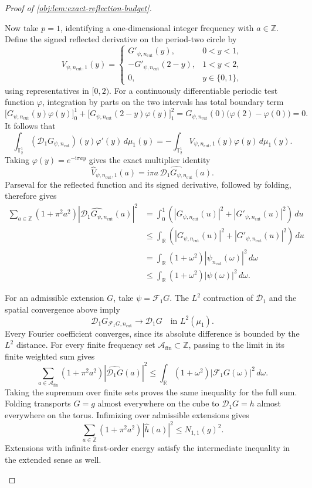 \documentclass[11pt]{article}
\begin{document}
\begin{proof}[Proof of \cref{obj:lem:exact-reflection-budget}]
\begin{enumerate}
Now take \(p=1\), identifying a one-dimensional integer frequency with \(a\in\mathbb Z\). Define the signed reflected derivative on the period-two circle by
\[
V_{\psi,n_{\mathrm{cut}},1}(y)
=
\begin{cases}
G'_{\psi,n_{\mathrm{cut}}}(y),&0<y<1,\\
-G'_{\psi,n_{\mathrm{cut}}}(2-y),&1<y<2,\\
0,&y\in\{0,1\},
\end{cases}
\]
using representatives in \([0,2)\). For a continuously differentiable periodic test function \(\varphi\), integration by parts on the two intervals has total boundary term
\[
\bigl[G_{\psi,n_{\mathrm{cut}}}(y)\varphi(y)\bigr]_0^1
+
\bigl[G_{\psi,n_{\mathrm{cut}}}(2-y)\varphi(y)\bigr]_1^2
=
G_{\psi,n_{\mathrm{cut}}}(0)\bigl(\varphi(2)-\varphi(0)\bigr)
=
0.
\]
It follows that
\[
\int_{\mathbb T_2^1}
(\mathscr D_1G_{\psi,n_{\mathrm{cut}}})(y)\varphi'(y)\,d\mu_1(y)
=
-\int_{\mathbb T_2^1}
V_{\psi,n_{\mathrm{cut}},1}(y)\varphi(y)\,d\mu_1(y).
\]
Taking \(\varphi(y)=e^{-\mathrm i\pi ay}\) gives the exact multiplier identity
\[
\widehat V_{\psi,n_{\mathrm{cut}},1}(a)
=
\mathrm i\pi a\,
\widehat{\mathscr D_1G_{\psi,n_{\mathrm{cut}}}}(a).
\]
Parseval for the reflected function and its signed derivative, followed by folding, therefore gives
\[
\begin{aligned}
\sum_{a\in\mathbb Z}(1+\pi^2a^2)
\left|\widehat{\mathscr D_1G_{\psi,n_{\mathrm{cut}}}}(a)\right|^2
&=
\int_0^1
\left(
|G_{\psi,n_{\mathrm{cut}}}(u)|^2+
|G'_{\psi,n_{\mathrm{cut}}}(u)|^2
\right)\,du\\
&\leq
\int_{\mathbb R}
\left(
|G_{\psi,n_{\mathrm{cut}}}(u)|^2+
|G'_{\psi,n_{\mathrm{cut}}}(u)|^2
\right)\,du\\
&=
\int_{\mathbb R}(1+\omega^2)
|\psi_{n_{\mathrm{cut}}}(\omega)|^2\,d\omega\\
&\leq
\int_{\mathbb R}(1+\omega^2)|\psi(\omega)|^2\,d\omega.
\end{aligned}
\]

For an admissible extension \(G\), take \(\psi=\mathcal F_1G\).
The \(L^2\) contraction of \(\mathscr D_1\) and the spatial convergence above imply
\[
\mathscr D_1G_{\mathcal F_1G,n_{\mathrm{cut}}}
\longrightarrow\mathscr D_1G
\quad\text{in }L^2(\mu_1).
\]
Every Fourier coefficient converges, since its absolute difference is bounded by the \(L^2\) distance. For every finite frequency set \(\mathcal A_{\mathrm{fin}}\subset\mathbb Z\), passing to the limit in its finite weighted sum gives
\[
\sum_{a\in\mathcal A_{\mathrm{fin}}}(1+\pi^2a^2)
|\widehat{\mathscr D_1G}(a)|^2
\leq
\int_{\mathbb R}(1+\omega^2)|\mathcal F_1G(\omega)|^2\,d\omega.
\]
Taking the supremum over finite sets proves the same inequality for the full sum. Folding transports \(G=g\) almost everywhere on the cube to
\(\mathscr D_1G=h\) almost everywhere on the torus. Infimizing over admissible extensions gives
\[
\sum_{a\in\mathbb Z}(1+\pi^2a^2)|\widehat h(a)|^2
\leq N_{1,1}(g)^2.
\]
Extensions with infinite first-order energy satisfy the intermediate inequality in the extended sense as well.


\end{enumerate}
\end{proof}
\end{document}
